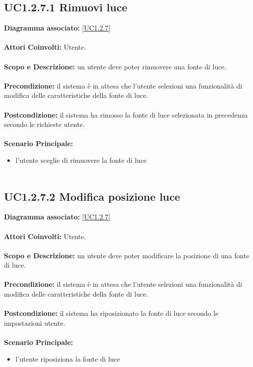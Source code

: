 \subsection{UC1.2.7.1 Rimuovi luce}
\textbf{Diagramma associato:}
\ref{UC1.2.7} \\ \\
\textbf{Attori Coinvolti:}
Utente. \\ \\
\textbf{Scopo e Descrizione:}
un utente deve poter rimuovere una fonte di luce. \\ \\
\textbf{Precondizione:}
il sistema è in attesa che l'utente selezioni una funzionalità di modifica delle caratteristiche della fonte di luce. \\ \\
\textbf{Postcondizione:}
il sistema ha rimosso la fonte di luce selezionata in precedenza secondo le richieste utente. \\ \\
\textbf{Scenario Principale:}
\begin{itemize}
\item l'utente sceglie di rimuovere la fonte di luce
\\ \\ \end{itemize}


\subsection{UC1.2.7.2 Modifica posizione luce}
\textbf{Diagramma associato:}
\ref{UC1.2.7} \\ \\
\textbf{Attori Coinvolti:}
Utente. \\ \\
\textbf{Scopo e Descrizione:}
un utente deve poter modificare la posizione di una fonte di luce. \\ \\
\textbf{Precondizione:}
il sistema è in attesa che l'utente selezioni una funzionalità di modifica delle caratteristiche della fonte di luce. \\ \\
\textbf{Postcondizione:}
il sistema ha riposizionato la fonte di luce secondo le impostazioni utente. \\ \\
\textbf{Scenario Principale:}
\begin{itemize}
\item l'utente riposiziona la fonte di luce
\\ \\ \end{itemize}


